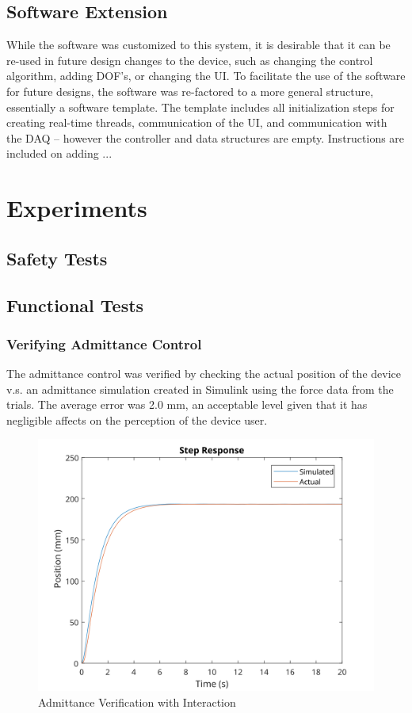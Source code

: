 \documentclass[12pt]{report}
\begin{document}
	\section{Software Extension}
	
			While the software was customized to this system, it is desirable that it can be re-used in future design changes to the device, such as changing the control algorithm, adding DOF's, or changing the UI. To facilitate the use of the software for future designs, the software was re-factored to a more general structure, essentially a software template. The template includes  all initialization steps for creating real-time threads, communication of the UI, and communication with the DAQ -- however the controller and data structures are empty. Instructions are included on adding ...
	
\chapter{Experiments}



	\section{Safety Tests}
	\section{Functional Tests}

	\subsection{Verifying Admittance Control}
	
		The admittance control was verified by checking the actual position of the device v.s. an admittance simulation created in Simulink using the force data from the trials. The average error was  2.0 mm, an acceptable level given that it has negligible affects on the perception of the device user. 

	
\begin{figure}[t] 
	\centering
	\includegraphics[width=0.9\linewidth]{Mar12_NoForce_Step_Plot}
	\caption{Admittance Verification with Interaction}
	\label{fig:nVerNoInt}
\end{figure}
	
\end{document}
